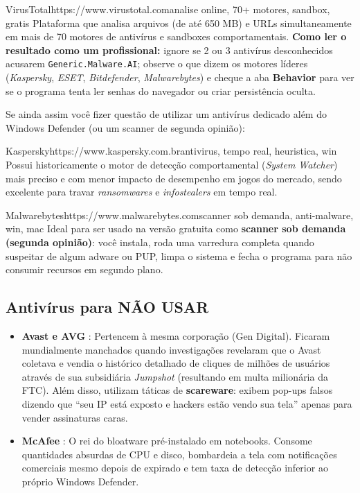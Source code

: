 \documentclass{pousadaguide}
\begin{document}
\begin{ferramenta}[goat,logo=virustotal]{VirusTotal}{https://www.virustotal.com}{analise online, 70+ motores, sandbox, gratis}
Plataforma que analisa arquivos (de até 650 MB) e URLs simultaneamente em mais de 70 motores de antivírus e sandboxes comportamentais. \textbf{Como ler o resultado como um profissional:} ignore se 2 ou 3 antivírus desconhecidos acusarem \texttt{Generic.Malware.AI}; observe o que dizem os motores líderes (\emph{Kaspersky}, \emph{ESET}, \emph{Bitdefender}, \emph{Malwarebytes}) e cheque a aba \textbf{Behavior} para ver se o programa tenta ler senhas do navegador ou criar persistência oculta. 
\end{ferramenta}

Se ainda assim você fizer questão de utilizar um antivírus dedicado além do Windows Defender (ou um scanner de segunda opinião):

\begin{ferramenta}[recomendado,logo=kaspersky]{Kaspersky}{https://www.kaspersky.com.br}{antivirus, tempo real, heuristica, win}
Possui historicamente o motor de detecção comportamental (\emph{System Watcher}) mais preciso e com menor impacto de desempenho em jogos do mercado, sendo excelente para travar \emph{ransomwares} e \emph{infostealers} em tempo real. 
\end{ferramenta}

\begin{ferramenta}[recomendado,logo=malwarebytes]{Malwarebytes}{https://www.malwarebytes.com}{scanner sob demanda, anti-malware, win, mac}
Ideal para ser usado na versão gratuita como \textbf{scanner sob demanda (segunda opinião)}: você instala, roda uma varredura completa quando suspeitar de algum adware ou PUP, limpa o sistema e fecha o programa para não consumir recursos em segundo plano. 
\end{ferramenta}

\subsection{Antivírus para NÃO USAR}

\begin{perigo}
\begin{itemize}
  \item \textbf{Avast e AVG} : Pertencem à mesma corporação (Gen Digital). Ficaram mundialmente manchados quando investigações revelaram que o Avast coletava e vendia o histórico detalhado de cliques de milhões de usuários através de sua subsidiária \emph{Jumpshot} (resultando em multa milionária da FTC). Além disso, utilizam táticas de \textbf{scareware}: exibem pop-ups falsos dizendo que ``seu IP está exposto e hackers estão vendo sua tela'' apenas para vender assinaturas caras.
  \item \textbf{McAfee} : O rei do bloatware pré-instalado em notebooks. Consome quantidades absurdas de CPU e disco, bombardeia a tela com notificações comerciais mesmo depois de expirado e tem taxa de detecção inferior ao próprio Windows Defender.
\end{itemize}
\end{perigo}
\end{document}
